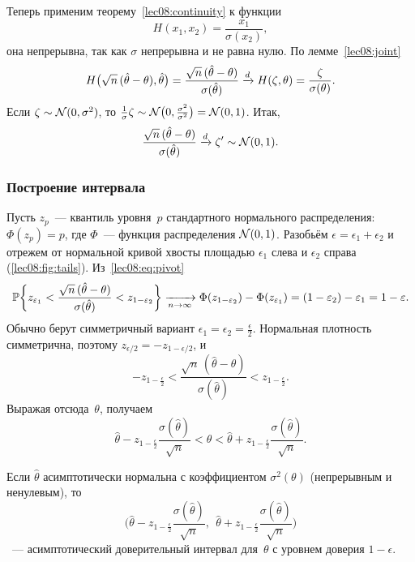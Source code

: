 Теперь применим теорему~\ref{lec08:continuity} к функции
\[
  H(x_1, x_2) = \frac{x_1}{\sigma(x_2)},
\]
она непрерывна, так как $\sigma$ непрерывна и не равна нулю. По лемме~\ref{lec08:joint}
\[
  H\bigl(\sqrt{n}\,(\hat\theta - \theta), \hat\theta\bigr)
  = \frac{\sqrt{n}\,(\hat\theta - \theta)}{\sigma(\hat\theta)}
  \tod H(\zeta, \theta) = \frac{\zeta}{\sigma(\theta)}.
\]
Если $\zeta \sim \Norm(0, \sigma^2)$, то $\frac1\sigma \zeta \sim \Norm\bigl(0, \frac{\sigma^2}{\sigma^2}\bigr) = \Norm(0, 1)$.
Итак,
\begin{equation}
  \label{lec08:eq:pivot}
  \frac{\sqrt{n}\,(\hat\theta - \theta)}{\sigma(\hat\theta)} \tod \zeta' \sim \Norm(0, 1).
\end{equation}

\subsubsection{Построение интервала}

Пусть $z_p$~--- квантиль уровня~$p$ стандартного нормального распределения: $\Phi(z_p) = p$,
где $\Phi$~--- функция распределения $\Norm(0, 1)$. Разобьём $\epsilon = \epsilon_1 + \epsilon_2$
и отрежем от нормальной кривой хвосты площадью $\epsilon_1$ слева и $\epsilon_2$ справа
(\cref{lec08:fig:tails}). Из~\eqref{lec08:eq:pivot}
\[
  \P\biggl\{ z_{\epsilon_1} < \frac{\sqrt{n}\,(\hat\theta - \theta)}{\sigma(\hat\theta)} < z_{1 - \epsilon_2} \biggr\}
  \xrightarrow[n \to \infty]{} \Phi(z_{1-\epsilon_2}) - \Phi(z_{\epsilon_1}) = (1 - \epsilon_2) - \epsilon_1 = 1 - \epsilon.
\]
Обычно берут симметричный вариант $\epsilon_1 = \epsilon_2 = \frac\epsilon2$. Нормальная плотность
симметрична, поэтому $z_{\epsilon/2} = -z_{1 - \epsilon/2}$, и
\[
  -z_{1 - \frac\epsilon2} < \frac{\sqrt{n}\,(\hat\theta - \theta)}{\sigma(\hat\theta)} < z_{1 - \frac\epsilon2}.
\]
Выражая отсюда~$\theta$, получаем
\[
  \hat\theta - z_{1 - \frac\epsilon2} \frac{\sigma(\hat\theta)}{\sqrt n}
  < \theta <
  \hat\theta + z_{1 - \frac\epsilon2} \frac{\sigma(\hat\theta)}{\sqrt n}.
\]

\begin{keybox}
  Если $\hat\theta$ асимптотически нормальна с коэффициентом $\sigma^2(\theta)$ (непрерывным
  и ненулевым), то
  \[
    \biggl( \hat\theta - z_{1 - \frac\epsilon2} \frac{\sigma(\hat\theta)}{\sqrt n},\ \
            \hat\theta + z_{1 - \frac\epsilon2} \frac{\sigma(\hat\theta)}{\sqrt n} \biggr)
  \]
  ~--- асимптотический доверительный интервал для~$\theta$ с уровнем доверия $1 - \epsilon$.
\end{keybox}

